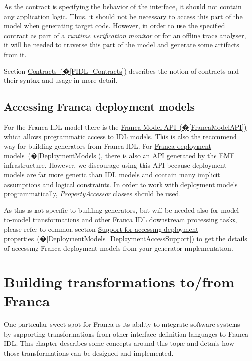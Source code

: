 \documentclass[a4paper,10pt]{scrreprt}
\begin{document}
As the contract is specifying the behavior of the interface, it should not contain 
any application logic. Thus, it should not be necessary to access this part of the model
when generating target code. However, in order to use the specified contract as part
of a \textit{runtime verification monitor} or for an offline trace analyser, it will be needed
to traverse this part of the model and generate some artifacts from it.

Section \hyperref[FIDL_Contracts]{Contracts~(�\ref*{FIDL_Contracts})} describes the notion of contracts and their 
syntax and usage in more detail.

\section{Accessing Franca deployment models}
\label{BuildingGenerators_AccessingFrancaDeploymentModels}
For the Franca IDL model there is the \hyperref[FrancaModelAPI]{Franca Model API~(�\ref*{FrancaModelAPI})} which allows
programmatic access to IDL models. This is also the recommend way for building generators
from Franca IDL.
For \hyperref[DeploymentModels]{Franca deployment models~(�\ref*{DeploymentModels})}, there is also an API generated by the
EMF infrastructure. However, we discourage using this API because deployment models are far more
generic than IDL models and contain many implicit assumptions and logical constraints. 
In order to work with deployment models programmatically, \textit{PropertyAccessor} classes
should be used.

As this is not specific to building generators, but will be needed also for model-to-model
transformations and other Franca IDL downstream processing tasks, please refer to common section 
\hyperref[DeploymentModels_DeploymentAccessSupport]{Support for accessing deployment properties~(�\ref*{DeploymentModels_DeploymentAccessSupport})}
to get the details of accessing Franca deployment models from your generator implementation.


\chapter{Building transformations to/from Franca}
\label{BuildingTransformations}
One particular sweet spot for Franca is its ability to integrate software systems
by supporting transformations from other interface definition languages to Franca IDL.
This chapter describes some concepts around this topic and details how those
transformations can be designed and implemented.
\end{document}

